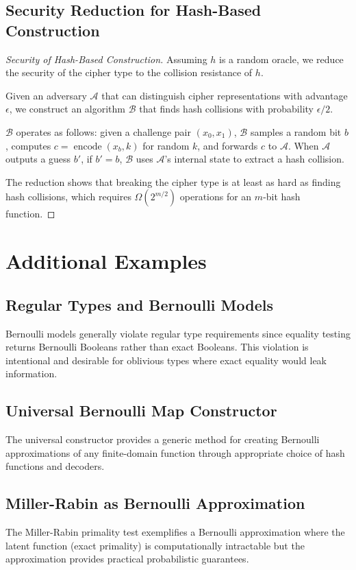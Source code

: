 \documentclass[11pt]{article}
\theoremstyle{definition}
\theoremstyle{plain}
\theoremstyle{remark}
\newcommand{\encode}{\operatorname{encode}}
\begin{document}
\subsection{Security Reduction for Hash-Based Construction}

\begin{proof}[Security of Hash-Based Construction]
Assuming $h$ is a random oracle, we reduce the security of the cipher type to the collision resistance of $h$.

Given an adversary $\mathcal{A}$ that can distinguish cipher representations with advantage $\epsilon$, we construct an algorithm $\mathcal{B}$ that finds hash collisions with probability $\epsilon/2$.

$\mathcal{B}$ operates as follows: given a challenge pair $(x_0, x_1)$, $\mathcal{B}$ samples a random bit $b$, computes $c = \encode(x_b, k)$ for random $k$, and forwards $c$ to $\mathcal{A}$. When $\mathcal{A}$ outputs a guess $b'$, if $b' = b$, $\mathcal{B}$ uses $\mathcal{A}$'s internal state to extract a hash collision.

The reduction shows that breaking the cipher type is at least as hard as finding hash collisions, which requires $\Omega(2^{m/2})$ operations for an $m$-bit hash function.
\end{proof}

\section{Additional Examples}

\subsection{Regular Types and Bernoulli Models}

Bernoulli models generally violate regular type requirements since equality testing returns Bernoulli Booleans rather than exact Booleans. This violation is intentional and desirable for oblivious types where exact equality would leak information.

\subsection{Universal Bernoulli Map Constructor}

The universal constructor provides a generic method for creating Bernoulli approximations of any finite-domain function through appropriate choice of hash functions and decoders.

\subsection{Miller-Rabin as Bernoulli Approximation}

The Miller-Rabin primality test exemplifies a Bernoulli approximation where the latent function (exact primality) is computationally intractable but the approximation provides practical probabilistic guarantees.
\end{document}

